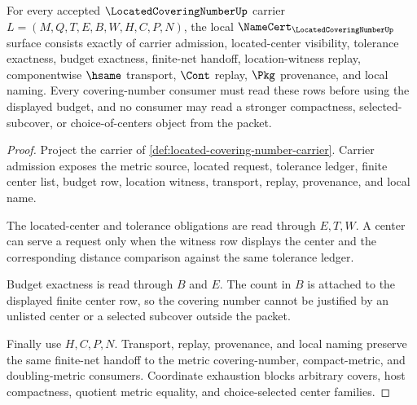 \begin{theorem}
\label{thm:located-covering-number-namecert-obligations}
For every accepted $\LocatedCoveringNumberUp$ carrier $L=(M,Q,T,E,B,W,H,C,P,N)$, the local $\NameCert_{\LocatedCoveringNumberUp}$ surface consists exactly of carrier admission, located-center visibility, tolerance exactness, budget exactness, finite-net handoff, location-witness replay, componentwise $\hsame$ transport, $\Cont$ replay, $\Pkg$ provenance, and local naming. Every covering-number consumer must read these rows before using the displayed budget, and no consumer may read a stronger compactness, selected-subcover, or choice-of-centers object from the packet.
\end{theorem}
\begin{proof}
Project the carrier of \autoref{def:located-covering-number-carrier}. Carrier admission exposes the metric source, located request, tolerance ledger, finite center list, budget row, location witness, transport, replay, provenance, and local name.

The located-center and tolerance obligations are read through $E,T,W$. A center can serve a request only when the witness row displays the center and the corresponding distance comparison against the same tolerance ledger.

Budget exactness is read through $B$ and $E$. The count in $B$ is attached to the displayed finite center row, so the covering number cannot be justified by an unlisted center or a selected subcover outside the packet.

Finally use $H,C,P,N$. Transport, replay, provenance, and local naming preserve the same finite-net handoff to the metric covering-number, compact-metric, and doubling-metric consumers. Coordinate exhaustion blocks arbitrary covers, host compactness, quotient metric equality, and choice-selected center families.
\end{proof}



